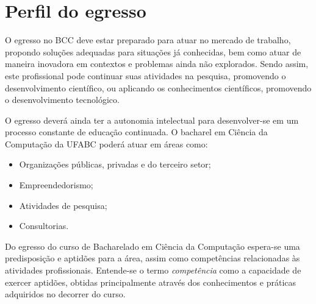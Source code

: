 \section{Perfil do egresso}

O egresso no BCC deve estar preparado para atuar no mercado de trabalho,
propondo soluções adequadas para situações já conhecidas, bem como atuar de
maneira inovadora em contextos e problemas ainda não explorados.
Sendo assim, este profissional pode continuar suas atividades na pesquisa,
promovendo o desenvolvimento científico, ou aplicando os conhecimentos
científicos, promovendo o desenvolvimento tecnológico.

O egresso deverá ainda ter a autonomia intelectual para desenvolver-se em um
processo constante de educação continuada.
O bacharel em Ciência da Computação da UFABC poderá atuar em áreas como:
\begin{itemize}
    \item Organizações públicas, privadas e do terceiro setor;
    \item Empreendedorismo;
    \item Atividades de pesquisa;
    \item Consultorias.
\end{itemize}

Do egresso do curso de Bacharelado em Ciência da Computação espera-se uma
predisposição e aptidões para a área, assim como competências relacionadas às
atividades profissionais.
Entende-se o termo \textit{competência} como a capacidade de exercer aptidões,
obtidas principalmente através dos conhecimentos e práticas adquiridos no
decorrer do curso.


